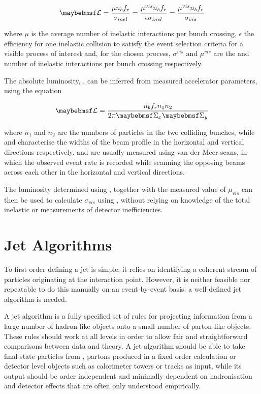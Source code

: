 \begin{equation}
  \label{eq:bg-theory:luminosity_vis}
  \luminosity = \frac{\mu n_b f_r}{\sigma_{inel}} = \frac{\mu^{vis} n_b f_r}{\epsilon \sigma_{inel}} = \frac{\mu^{vis} n_b f_r}{\sigma_{vis}}
\end{equation}

\noindent where $\mu$ is the average number of inelastic interactions per bunch crossing, $\epsilon$ the efficiency for one inelastic collision to satisfy the event selection criteria for a visible process of interest and, for the chosen process, $\sigma^{vis}$ and $\mu^{vis}$ are the \xs and number of inelastic interactions per bunch crossing respectively.

The absolute luminosity, \luminosity, can be inferred from measured accelerator parameters, using the equation

\begin{equation}
  \label{eq:bg-theory:vdMscan}
  \luminosity = \frac{n_b f_r n_1 n_2}{2 \pi \Sigmax \Sigmay}
\end{equation}

\noindent where $n_1$ and $n_2$ are the numbers of particles in the two colliding bunches, while \Sigmax and \Sigmay characterise the widths of the beam profile in the horizontal and vertical directions respectively.
\Sigmax and \Sigmay are usually measured using van der Meer scans, in which the observed event rate is recorded while scanning the opposing beams across each other in the horizontal and vertical directions.

The luminosity determined using , together with the measured value of $\mu_{vis}$ can then be used to calculate $\sigma_{vis}$ using , without relying on knowledge of the total inelastic \xs or measurements of detector inefficiencies.

\section{Jet Algorithms}
To first order defining a jet is simple: it relies on identifying a coherent stream of particles originating at the interaction point.
However, it is neither feasible nor repeatable to do this manually on an event-by-event basis: a well-defined jet algorithm is needed.

A jet algorithm is a fully specified set of rules for projecting information from a large number of hadron-like objects onto a small number of parton-like
objects.
These rules should work at all levels in order to allow fair and straightforward comparisons between data and theory.
A jet algorithm should be able to take final-state particles from \MC, partons produced in a fixed order \pQCD calculation or detector level objects such as calorimeter towers or tracks as input, while its output should be order independent and minimally dependent on hadronisation and detector effects that are often only understood empirically.

